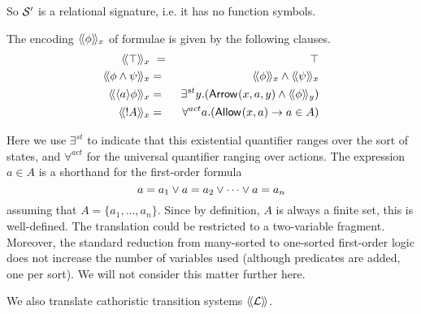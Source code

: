 \NI So $\mathcal{S}'$ is a relational signature, i.e. it has no function
symbols. 

\begin{definition}
The encoding $\langle\!\langle \phi \rangle\!\rangle_x$ of \cathoristic{} formulae is given by the following clauses.
\begin{eqnarray*}
  \SEMBTWO{\top}_x & \ = \ & \top
     \\
  \SEMBTWO{\phi \AND \psi}_x & = & \SEMBTWO{\phi}_x \AND \SEMBTWO{\psi}_x
     \\
  \SEMBTWO{\langle a \rangle \phi}_x & = & \exists^{st} y.(\ARROWTWO{}{x}{a}{y} \AND \SEMBTWO{\phi}_y)
     \\
  \SEMBTWO{\fBang A}_x & = & \forall^{act} a.(\ALLOWED{}{x}{a} \IMPLIES a \in A) 
\end{eqnarray*}

\end{definition}

\NI Here we use $\exists^{st}$ to indicate that this existential
quantifier ranges over the sort of states, and $\forall^{act}$ for the
universal quantifier ranging over actions. The expression $a \in A$ is
a shorthand for the first-order formula
\[
   a = a_1 \lor a = a_2 \lor \cdots \lor a = a_n
\]
assuming that $A = \{a_1, ..., a_n\}$. Since by definition, $A$ is
always a finite set, this is well-defined.  The translation could be
restricted to a two-variable fragment. Moreover, the standard
reduction from many-sorted to one-sorted first-order logic does not
increase the number of variables used (although predicates are added,
one per sort). We will not consider this matter further here.  

We also translate cathoristic transition systems $\langle\!\langle \mathcal{L} \rangle\!\rangle$.

